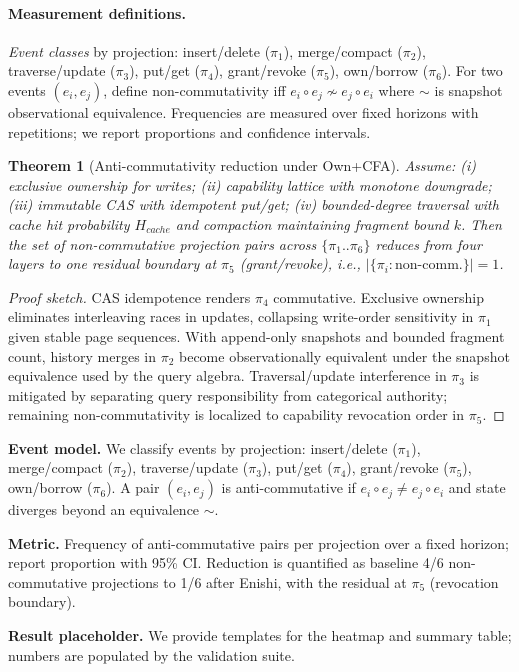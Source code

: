 \documentclass[10pt]{article}
\newtheorem{theorem}{Theorem}
\begin{document}
\paragraph{Measurement definitions.}
\emph{Event classes} by projection: insert/delete ($\pi_1$), merge/compact ($\pi_2$), traverse/update ($\pi_3$), put/get ($\pi_4$), grant/revoke ($\pi_5$), own/borrow ($\pi_6$). For two events $(e_i,e_j)$, define non-commutativity iff $e_i\circ e_j\not\sim e_j\circ e_i$ where $\sim$ is snapshot observational equivalence. Frequencies are measured over fixed horizons with repetitions; we report proportions and confidence intervals.
\begin{theorem}[Anti-commutativity reduction under Own+CFA]
Assume: (i) exclusive ownership for writes; (ii) capability lattice with monotone downgrade; (iii) immutable CAS with idempotent put/get; (iv) bounded-degree traversal with cache hit probability $H_{cache}$ and compaction maintaining fragment bound $k$. Then the set of non-commutative projection pairs across $\{\pi_1..\pi_6\}$ reduces from four layers to one residual boundary at $\pi_5$ (grant/revoke), i.e., $|\{\pi_i:\text{non-comm.}\}|=1$.
\end{theorem}
\begin{proof}[Proof sketch]
CAS idempotence renders $\pi_4$ commutative. Exclusive ownership eliminates interleaving races in updates, collapsing write-order sensitivity in $\pi_1$ given stable page sequences. With append-only snapshots and bounded fragment count, history merges in $\pi_2$ become observationally equivalent under the snapshot equivalence used by the query algebra. Traversal/update interference in $\pi_3$ is mitigated by separating query responsibility from categorical authority; remaining non-commutativity is localized to capability revocation order in $\pi_5$.
\end{proof}
\textbf{Event model.} We classify events by projection: insert/delete ($\pi_1$), merge/compact ($\pi_2$), traverse/update ($\pi_3$), put/get ($\pi_4$), grant/revoke ($\pi_5$), own/borrow ($\pi_6$). A pair $(e_i,e_j)$ is anti-commutative if $e_i\circ e_j\ne e_j\circ e_i$ and state diverges beyond an equivalence $\sim$.

\textbf{Metric.} Frequency of anti-commutative pairs per projection over a fixed horizon; report proportion with 95\% CI. Reduction is quantified as baseline 4/6 non-commutative projections to 1/6 after Enishi, with the residual at $\pi_5$ (revocation boundary).

\textbf{Result placeholder.} We provide templates for the heatmap and summary table; numbers are populated by the validation suite.
\end{document}
